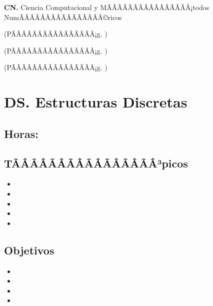 	\textbf{CN.}  Ciencia Computacional y MÃÂÃÂÃÂÃÂÃÂÃÂÃÂÃÂ¡todos NumÃÂÃÂÃÂÃÂÃÂÃÂÃÂÃÂ©ricos%
	\begin{list}{}{%
		\setlength{\labelwidth}{0pt}%
		\setlength{\leftmargin}{15pt}}%
		\item \CNUNODef(PÃÂÃÂÃÂÃÂÃÂÃÂÃÂÃÂ¡g. \pageref{sec:BOK-CN1})
		\item \CNDOSDef(PÃÂÃÂÃÂÃÂÃÂÃÂÃÂÃÂ¡g. \pageref{sec:BOK-CN2})
		\item \CNTRESDef(PÃÂÃÂÃÂÃÂÃÂÃÂÃÂÃÂ¡g. \pageref{sec:BOK-CN3})
	\end{list}%

\section{DS. Estructuras Discretas}\label{sec:BOK-DS}
\subsection{\DSUNODef}\label{sec:BOK-DS1}
\subsection*{Horas: \DSUNOHours}

\subsection*{TÃÂÃÂÃÂÃÂÃÂÃÂÃÂÃÂ³picos}
\begin{itemize}
	\item \DSUNOTopicFunciones
	\item \DSUNOTopicRelaciones
	\item \DSUNOTopicConjuntos
	\item \DSUNOTopicPrincipio
	\item \DSUNOTopicCardinalidad
\end{itemize}

\subsection*{Objetivos}
\begin{itemize}
	\item \DSUNOObjUNO
	\item \DSUNOObjDOS
	\item \DSUNOObjTRES
	\item \DSUNOObjCUATRO
\end{itemize}


